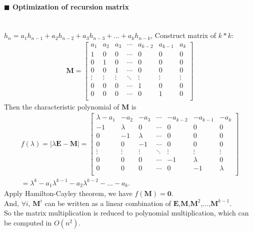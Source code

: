 \documentclass[10pt]{article}
\begin{document}
\paragraph{$\blacksquare$ Optimization of recursion matrix}
\noindent \\
$h_n=a_1h_{n-1}+a_2h_{n-2}+a_3h_{n-3}+ \ldots + a_kh_{n-k}$, Construct matrix of $k*k$:
\begin{gather*}
\mathbf{M} =
\begin{bmatrix}
a_1 & a_2 & a_3 & \cdots & a_{k-2} & a_{k-1} & a_k \\
1 & 0 & 0 & \cdots & 0 & 0 & 0 \\
0 & 1 & 0 & \cdots & 0 & 0 & 0 \\
0 & 0 & 1 & \cdots & 0 & 0 & 0 \\
\vdots & \vdots & \vdots & \ddots & \vdots & \vdots & \vdots \\
0 & 0 & 0 & \cdots & 1 & 0 & 0 \\
0 & 0 & 0 & \cdots & 0 & 1 & 0 \\
\end{bmatrix}
\end{gather*}
Then the characteristic polynomial of $\mathbf{M}$ is
\begin{gather*}
f(\lambda)=|\lambda \mathbf{E} - \mathbf{M}| =
\begin{bmatrix}
\lambda - a_1 & -a_2 & -a_3 & \cdots & -a_{k-2} & -a_{k-1} & -a_k \\
-1 & \lambda & 0 & \cdots & 0 & 0 & 0 \\
0 & -1 & \lambda & \cdots & 0 & 0 & 0 \\
0 & 0 & -1 & \cdots & 0 & 0 & 0 \\
\vdots & \vdots & \vdots & \ddots & \vdots & \vdots & \vdots \\
0 & 0 & 0 & \cdots & -1 & \lambda & 0 \\
0 & 0 & 0 & \cdots & 0 & -1 & \lambda \\
\end{bmatrix}
\\
=\lambda ^k - a_1 \lambda ^ {k-1} - a_2 \lambda ^ {k-2} - \ldots - a_k.
\end{gather*}
Apply Hamilton-Cayley theorem, we have $f(\mathbf{M})=\mathbf{0}$. \\
And, $\forall i$, $\mathbf{M} ^ i$ can be written as a linear combination of $\mathbf{E}$,$\mathbf{M}$,$\mathbf{M} ^2$,$\ldots$,$\mathbf{M} ^ {k-1}$.\\
So the matrix multiplication is reduced to polynomial multiplication, which can be computed in $O(n^2)$. \\

\end{document}
